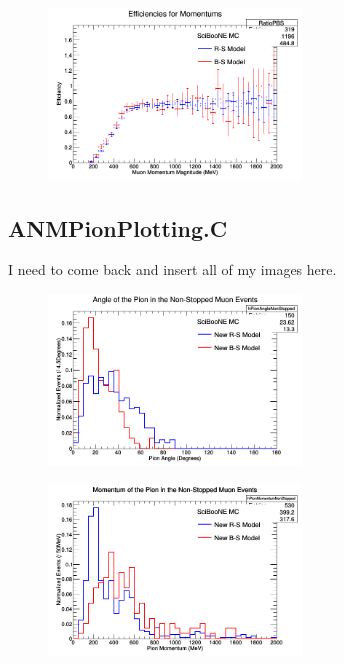 \documentclass[11pt]{article}
\begin{document}
\begin{figure}[H]
\centering
\includegraphics[width=0.6\textwidth]{ANMCombinedPlotsImages/18-ANMCombinedPlots.png}
\caption{}
\end{figure}

\subsection{ANMPionPlotting.C}
I need to come back and insert all of my images here.

\begin{figure}[H]
\centering
\includegraphics[width=0.6\textwidth]{ANMPionPlottingImages/1-ANMPionPlotting.png}
\caption{}
\end{figure}

\begin{figure}[H]
\centering
\includegraphics[width=0.6\textwidth]{ANMPionPlottingImages/2-ANMPionPlotting.png}
\caption{}
\end{figure}
\end{document}
